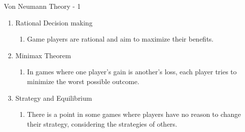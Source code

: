 \documentclass[xetex,notheorems,hyperref={pdfpagelabels=true},xcolor=table]{beamer}
\theoremstyle{plain}
\theoremstyle{definition}
\theoremstyle{example}
\theoremstyle{example}
\begin{document}
\begin{frame}{Von Neumann Theory - 1}
    \begin{enumerate}
        \item Rational Decision making
        \begin{enumerate}
            \item Game players are rational and aim to maximize their benefits.
        \end{enumerate}
        \item Minimax Theorem
        \begin{enumerate}
            \item In games where one player's gain is another's loss, each player tries to minimize the worst possible outcome.
        \end{enumerate}
        \item Strategy and Equilibrium
        \begin{enumerate}
            \item There is a point in some games where players have no reason to change their strategy, considering the strategies of others.
        \end{enumerate}
    \end{enumerate}
    \begin{figure}[h]
  \centering
\end{figure}
\end{frame}
\end{document}
